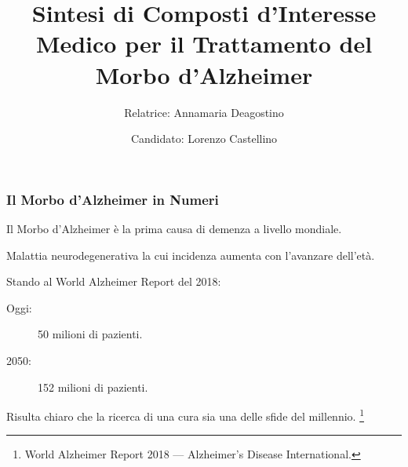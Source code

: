 \documentclass[9pt]{beamer}
\title{Sintesi di Composti d'Interesse Medico per il Trattamento del Morbo d'Alzheimer}
\author{
	Relatrice: Annamaria Deagostino \\
	\and
	Candidato: Lorenzo Castellino
}
\date{\center{Anno Accademico 2017-2018}}
\newcommand\blfootnote[1]{%
	\begingroup
	\renewcommand\thefootnote{}\footnote{#1}%
	\addtocounter{footnote}{-1}%
	\endgroup
}
\begin{document}
\begin{frame}
	\titlepage
\end{frame}

\begin{frame}
	\frametitle{Il Morbo d'Alzheimer in Numeri}
	Il Morbo d'Alzheimer è la prima causa di demenza a livello mondiale.

	Malattia neurodegenerativa la cui incidenza aumenta con l'avanzare dell'età.

	Stando al World Alzheimer Report del 2018:

	\begin{description}
		\item [Oggi:] 50 milioni di pazienti.

		\item [2050:] 152 milioni di pazienti.

	\end{description}

	Risulta chiaro che la ricerca di una cura sia una delle sfide del millennio. \blfootnote{World Alzheimer Report 2018 — Alzheimer’s Disease International.}
\end{frame}
\end{document}
